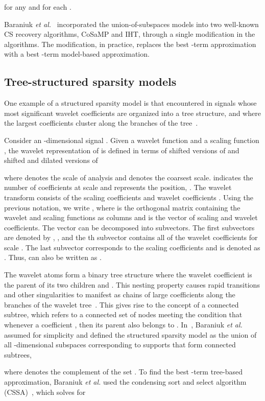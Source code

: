 \documentclass[journal]{IEEEtran}
\begin{document}
for any  and for each .

Baraniuk \textit{et al.}~\cite{Bara10} incorporated the union-of-subspaces models into two well-known CS recovery algorithms, CoSaMP and IHT, through a single modification in the algorithms. The modification, in practice, replaces the best -term approximation with a best -term model-based approximation.

\subsection{Tree-structured sparsity models}
One example of a structured sparsity model is that encountered in signals whose most significant wavelet coefficients are organized into a tree structure, and where the largest coefficients cluster along the branches of the tree~\cite{Bara10}.

Consider an -dimensional signal . Given a wavelet function  and a scaling function , the wavelet representation of  is defined in terms of shifted versions of  and shifted and dilated versions of 

where  denotes the scale of analysis and  denotes the coarsest scale.  indicates the number of coefficients at scale  and  represents the position, . The wavelet transform consists of the scaling coefficients  and wavelet coefficients . Using the previous notation, we write , where  is the orthogonal matrix containing the wavelet and scaling functions as columns and  is the vector of scaling and wavelet coefficients. The vector  can be decomposed into  subvectors. The first  subvectors are denoted by , , and the th subvector contains all of the wavelet coefficients for scale . The last subvector corresponds to the scaling coefficients and is denoted as . Thus,  can also be written as .

The wavelet atoms form a binary tree structure where the wavelet coefficient  is the parent of its two children  and . This nesting property causes rapid transitions and other singularities to manifest as chains of large coefficients along the branches of the wavelet tree~\cite{Crou98}. This gives rise to the concept of a connected subtree, which refers to a connected set of nodes  meeting the condition that whenever a coefficient , then its parent also belongs to . In~\cite{Bara10}, Baraniuk \textit{et al.} assumed  for simplicity and defined the structured sparsity model  as the union of all -dimensional subspaces corresponding to supports  that form connected subtrees,

where  denotes the complement of the set .
To find the best -term tree-based approximation,  Baraniuk \textit{et al.} used the condensing sort and select algorithm (CSSA)~\cite{Bara02}, which solves for
\end{document}
